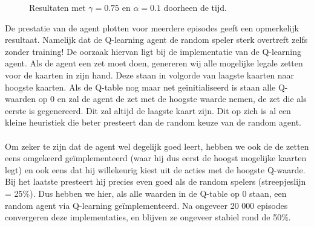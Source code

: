 \documentclass[11pt]{article}
\begin{document}
\begin{figure}[H]
    \centering
    \qquad
    \caption{Resultaten met $\gamma = 0.75$ en $\alpha = 0.1$ doorheen de tijd.}
    \label{fig:q_table_is_a_heuristic_player}
\end{figure}
\noindent De prestatie van de agent plotten voor meerdere episodes geeft een opmerkelijk resultaat. Namelijk dat de Q-learning agent de random speler sterk overtreft zelfs zonder training! De oorzaak hiervan ligt bij de implementatie van de Q-learning agent. Als de agent een zet moet doen, genereren wij alle mogelijke legale zetten voor de kaarten in zijn hand. Deze staan in volgorde van laagste kaarten naar hoogste kaarten. Als de Q-table nog maar net geïnitialiseerd is staan alle Q-waarden op 0 en zal de agent de zet met de hoogste waarde nemen, de zet die als eerste is gegenereerd. Dit zal altijd de laagste kaart zijn. Dit op zich is al een kleine heuristiek die beter presteert dan de random keuze van de random agent.\\\\
Om zeker te zijn dat de agent wel degelijk goed leert, hebben we ook de de zetten eens omgekeerd geïmplementeerd (waar hij dus eerst de hoogst mogelijke kaarten legt) en ook eens dat hij willekeurig kiest uit de acties met de hoogste Q-waarde. Bij het laatste presteert hij precies even goed als de random spelers (streepjeslijn = 25\%). Dus hebben we hier, als alle waarden in de Q-table op 0 staan, een random agent via Q-learning geïmplementeerd. Na ongeveer 20 000 episodes convergeren deze implementaties, en blijven ze ongeveer stabiel rond de 50\%.
\end{document}
